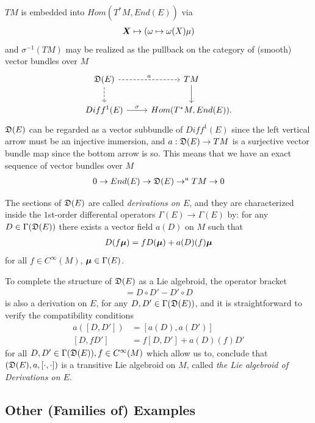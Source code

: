 $TM$ is embedded into $Hom(T^*M, End(E))$ via
\begin{align*}
    \bm{X} \mapsto (\omega \mapsto \omega(X) \mu)
\end{align*}
and $\sigma^{-1}(TM)$ may be realized as the pullback on the category of (smooth) vector bundles over $M$
\begin{equation*}
    \begin{tikzcd}
        \alg D(E) \arrow[dashed]{r}{a} \arrow[dashed]{d} & TM  \arrow{d}\\
        Diff^1(E) \arrow{r}{\sigma} & Hom(T^*M, End(E)).
    \end{tikzcd}
\end{equation*}
$\mathfrak{D}(E)$ can be regarded as a vector subbundle of $Diff^1(E)$ since the left vertical arrow must be an injective immersion, and $a: \mathfrak{D}(E) \to TM$ is a surjective vector bundle map since the bottom arrow is so. This means that we have an exact sequence of vector bundles over $M$
\begin{align}
        0 \rightarrow End(E) \rightarrow \mathfrak{D}(E) \rightarrow^a TM \rightarrow 0
\end{align}

The sections of $\mathfrak{D}(E)$ are called \emph{derivations on $E$}, and they are characterized inside the $1$st-order differental operators $\Gamma(E) \to \Gamma(E)$ by: for any $D \in \Gamma(\mathfrak{D}(E))$ there exists a vector field $a(D)$ on $M$ such that
\begin{align}
    D(f \bm{\mu}) = f D(\bm{\mu}) + a(D)(f) \bm{\mu}
\end{align}
for all $f \in C^\infty(M)$, $\bm{\mu} \in \Gamma(E)$.

To complete the structure of $\mathfrak{D}(E)$ as a Lie algebroid, the operator bracket
\begin{align*}
    [D, D'] = D \circ D' - D' \circ D
\end{align*}
is also a derivation on $E$, for any $D, D' \in \Gamma(\mathfrak{D}(E))$, and it is straightforward to verify the compatibility conditions
\begin{align}
    a([D, D']) &= [a(D), a(D')] \\
    [D, f D'] &= f[D, D'] + a(D)(f) D'
\end{align}
for all $D, D' \in \Gamma(\mathfrak{D}(E)), f \in C^\infty(M)$ which allow us to, conclude that $(\mathfrak{D}(E), a, [\cdot, \cdot])$ is a transitive Lie algebroid on $M$, called \emph{the Lie algebroid of Derivations on $E$}.

\subsection{Other (Families of) Examples}

